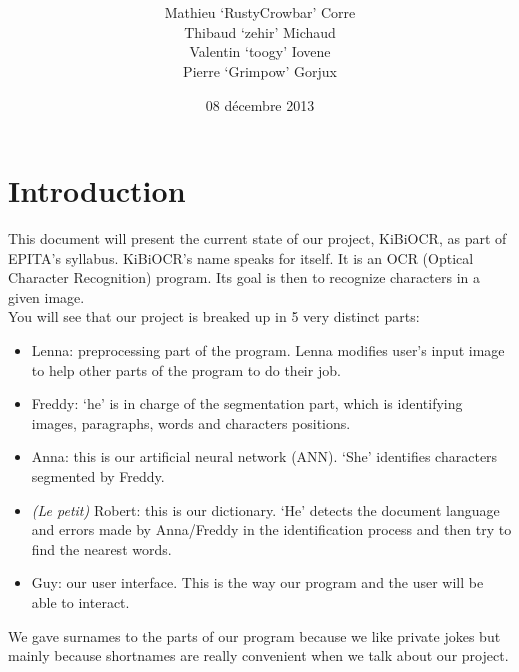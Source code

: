 \documentclass[12pt]{report}
\title{
}
\author{
    Mathieu `RustyCrowbar' Corre \\
    Thibaud `zehir' Michaud \\
    Valentin `toogy' Iovene \\
    Pierre `Grimpow' Gorjux
}
\date{08 décembre 2013}
\begin{document}
\maketitle

\tableofcontents

\chapter*{Introduction}

This document will present the current state of our project, KiBiOCR, as part of
EPITA's syllabus. KiBiOCR's name speaks for itself. It is an OCR (Optical
Character Recognition) program. Its goal is then to recognize characters in a
given image.\\

You will see that our project is breaked up in 5 very distinct parts:

\begin{itemize}
    \item{Lenna}: preprocessing part of the program. Lenna modifies user's input
        image to help other parts of the program to do their job.
    \item{Freddy}: `he' is in charge of the segmentation part, which is
        identifying images, paragraphs, words and characters positions.
    \item{Anna}: this is our artificial neural network (ANN). `She' identifies
        characters segmented by Freddy.
    \item{\emph{(Le petit)} Robert}: this is our dictionary. `He' detects the
        document language and errors made by Anna/Freddy in the identification
        process and then try to find the nearest words.
    \item{Guy}: our user interface. This is the way our program and the user
        will be able to interact.
\end{itemize}

We gave surnames to the parts of our program because we like private jokes but
mainly because shortnames are really convenient when we talk about our project.

% 
% 
\end{document}
